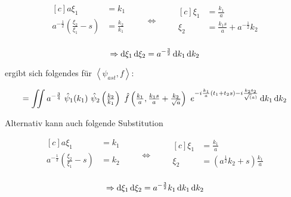 \documentclass{scrartcl}
\begin{document}
\begin{equation*}
\begin{aligned}[c]
a \xi_1 &= k_1\\
a^{-\frac{1}{2}} \left(\frac{\xi_2}{\xi_1} - s\right) &=\frac{k_2}{k_1}\\
\end{aligned}
\qquad\Longleftrightarrow\qquad
\begin{aligned}[c]
\xi_1 &= \frac{k_1}{a}\\
\xi_2 &= \frac{k_1 s}{a} + a^{-\frac{1}{2}} k_2\\
\end{aligned}
\end{equation*}

\begin{equation*}
\Rightarrow
\mathop{}\!\mathrm{d} \xi_1 \mathop{}\!\mathrm{d} \xi_2 = a^{-\frac{3}{2}} \mathop{}\!\mathrm{d} k_1 \mathop{}\!\mathrm{d} k_2
\end{equation*}

ergibt sich folgendes für $\left<\psi_{ast}, f\right>$:

\begin{equation}
\label{eq:psi_ast_f_1}
    =  \iint a^{-\frac{3}{4}}~\hat \psi_1(k_1) ~\hat \psi_2 \left(\tfrac{k_2}{k_1}\right)
    ~\hat f \left(\tfrac{k_1}{a}, \tfrac{k_1 s}{a} + \tfrac{k_2}{\sqrt{a}}\right)
    ~e^{-i\frac{k_1}{a}(t_1+t_2 s) - i \frac{k_2 t_2}{\sqrt(a)}}
    \mathop{}\!\mathrm{d} k_1 \mathop{}\!\mathrm{d} k_2
\end{equation}


Alternativ kann auch folgende Substitution

\begin{equation*}
\begin{aligned}[c]
a \xi_1 &= k_1\\
a^{-\frac{1}{2}} \left(\frac{\xi_2}{\xi_1} - s\right) &= k_2\\
\end{aligned}
\qquad\Longleftrightarrow\qquad
\begin{aligned}[c]
\xi_1 &= \frac{k_1}{a}\\
\xi_2 &= \left( a^\frac{1}{2} k_2 +s \right) \frac{k_1}{a}\\
\end{aligned}
\end{equation*}

\begin{equation*}
\Rightarrow
\mathop{}\!\mathrm{d} \xi_1 \mathop{}\!\mathrm{d} \xi_2 = a^{-\frac{3}{2}} k_1 \mathop{}\!\mathrm{d} k_1 \mathop{}\!\mathrm{d} k_2
\end{equation*}
\end{document}
